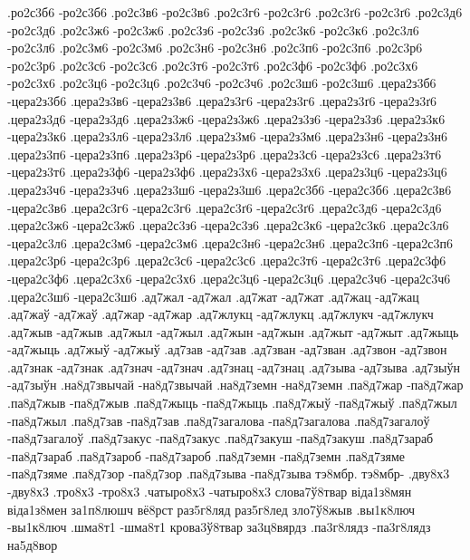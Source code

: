{%
.ро2с3б6 -ро2с3б6
.ро2с3в6 -ро2с3в6
.ро2с3г6 -ро2с3г6
.ро2с3ґ6 -ро2с3ґ6
.ро2с3д6 -ро2с3д6
.ро2с3ж6 -ро2с3ж6
.ро2с3з6 -ро2с3з6
.ро2с3к6 -ро2с3к6
.ро2с3л6 -ро2с3л6
.ро2с3м6 -ро2с3м6
.ро2с3н6 -ро2с3н6
.ро2с3п6 -ро2с3п6
.ро2с3р6 -ро2с3р6
.ро2с3с6 -ро2с3с6
.ро2с3т6 -ро2с3т6
.ро2с3ф6 -ро2с3ф6
.ро2с3х6 -ро2с3х6
.ро2с3ц6 -ро2с3ц6
.ро2с3ч6 -ро2с3ч6
.ро2с3ш6 -ро2с3ш6
.цера2з3б6 -цера2з3б6
.цера2з3в6 -цера2з3в6
.цера2з3г6 -цера2з3г6
.цера2з3ґ6 -цера2з3ґ6
.цера2з3д6 -цера2з3д6
.цера2з3ж6 -цера2з3ж6
.цера2з3з6 -цера2з3з6
.цера2з3к6 -цера2з3к6
.цера2з3л6 -цера2з3л6
.цера2з3м6 -цера2з3м6
.цера2з3н6 -цера2з3н6
.цера2з3п6 -цера2з3п6
.цера2з3р6 -цера2з3р6
.цера2з3с6 -цера2з3с6
.цера2з3т6 -цера2з3т6
.цера2з3ф6 -цера2з3ф6
.цера2з3х6 -цера2з3х6
.цера2з3ц6 -цера2з3ц6
.цера2з3ч6 -цера2з3ч6
.цера2з3ш6 -цера2з3ш6
.цера2с3б6 -цера2с3б6
.цера2с3в6 -цера2с3в6
.цера2с3г6 -цера2с3г6
.цера2с3ґ6 -цера2с3ґ6
.цера2с3д6 -цера2с3д6
.цера2с3ж6 -цера2с3ж6
.цера2с3з6 -цера2с3з6
.цера2с3к6 -цера2с3к6
.цера2с3л6 -цера2с3л6
.цера2с3м6 -цера2с3м6
.цера2с3н6 -цера2с3н6
.цера2с3п6 -цера2с3п6
.цера2с3р6 -цера2с3р6
.цера2с3с6 -цера2с3с6
.цера2с3т6 -цера2с3т6
.цера2с3ф6 -цера2с3ф6
.цера2с3х6 -цера2с3х6
.цера2с3ц6 -цера2с3ц6
.цера2с3ч6 -цера2с3ч6
.цера2с3ш6 -цера2с3ш6
%
%
%
.ад7жал -ад7жал
.ад7жат -ад7жат
.ад7жац -ад7жац
.ад7жаў -ад7жаў
.ад7жар -ад7жар
.ад7жлукц -ад7жлукц
.ад7жлукч -ад7жлукч
.ад7жыв -ад7жыв
.ад7жыл -ад7жыл
.ад7жын -ад7жын
.ад7жыт -ад7жыт
.ад7жыць -ад7жыць
.ад7жыў -ад7жыў
.ад7зав -ад7зав
.ад7зван -ад7зван
.ад7звон -ад7звон
.ад7знак -ад7знак
.ад7знач -ад7знач
.ад7знац -ад7знац
.ад7зыва -ад7зыва
.ад7зыўн -ад7зыўн
.на8д7звычай -на8д7звычай
.на8д7земн -на8д7земн
.па8д7жар -па8д7жар
.па8д7жыв -па8д7жыв
.па8д7жыць -па8д7жыць
.па8д7жыў -па8д7жыў
.па8д7жыл -па8д7жыл
.па8д7зав -па8д7зав
.па8д7загалова -па8д7загалова
.па8д7загалоў -па8д7загалоў
.па8д7закус -па8д7закус
.па8д7закуш -па8д7закуш
.па8д7зараб -па8д7зараб
.па8д7зароб -па8д7зароб
.па8д7земн -па8д7земн
.па8д7зяме -па8д7зяме
.па8д7зор -па8д7зор
.па8д7зыва -па8д7зыва
%
%
%
тэ8мбр. тэ8мбр-
.дву8х3 -дву8х3
.тро8х3 -тро8х3
.чатыро8х3 -чатыро8х3
слова7ў8твар
віда1з8мян
віда1з8мен
за1п8люшч
вё8рст
раз5г8ляд
раз5г8лед
зло7ў8жыв
.вы1к8люч -вы1к8люч
.шма8т1 -шма8т1
крова3ў8твар
за3ц8вярдз
.па3г8лядз -па3г8лядз
на5д8вор
}

